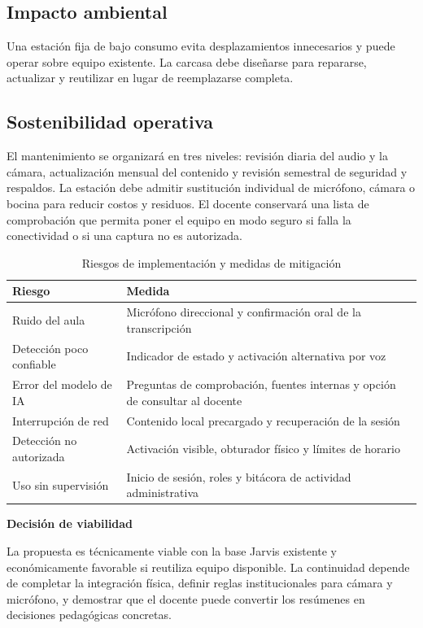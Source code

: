 \documentclass[letterpaper,11pt]{article}
\newcommand{\shortsection}[1]{\par\noindent\textbf{\fontsize{11}{19}\selectfont #1}\par}
\begin{document}
\clearpage

\subsection{Impacto ambiental}
Una estación fija de bajo consumo evita desplazamientos innecesarios y puede operar sobre equipo existente. La carcasa debe diseñarse para repararse, actualizar y reutilizar en lugar de reemplazarse completa.

\subsection{Sostenibilidad operativa}
El mantenimiento se organizará en tres niveles: revisión diaria del audio y la cámara, actualización mensual del contenido y revisión semestral de seguridad y respaldos. La estación debe admitir sustitución individual de micrófono, cámara o bocina para reducir costos y residuos. El docente conservará una lista de comprobación que permita poner el equipo en modo seguro si falla la conectividad o si una captura no es autorizada.

\begin{table}[H]
\centering
\caption{Riesgos de implementación y medidas de mitigación}
\small
\begin{tabularx}{\textwidth}{@{}>{\raggedright\arraybackslash}p{1.45in}>{\raggedright\arraybackslash}X@{}}
\toprule
\textbf{Riesgo} & \textbf{Medida} \\
\midrule
Ruido del aula & Micrófono direccional y confirmación oral de la transcripción \\
Detección poco confiable & Indicador de estado y activación alternativa por voz \\
Error del modelo de IA & Preguntas de comprobación, fuentes internas y opción de consultar al docente \\
Interrupción de red & Contenido local precargado y recuperación de la sesión \\
Detección no autorizada & Activación visible, obturador físico y límites de horario \\
Uso sin supervisión & Inicio de sesión, roles y bitácora de actividad administrativa \\
\bottomrule
\end{tabularx}
\end{table}

\shortsection{Decisión de viabilidad}
La propuesta es técnicamente viable con la base Jarvis existente y económicamente favorable si reutiliza equipo disponible. La continuidad depende de completar la integración física, definir reglas institucionales para cámara y micrófono, y demostrar que el docente puede convertir los resúmenes en decisiones pedagógicas concretas.
\end{document}
